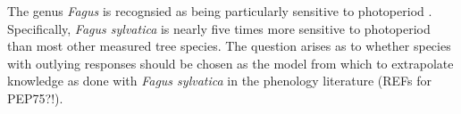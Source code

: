 \documentclass{article}\usepackage[]{graphicx}\usepackage[]{color}
\begin{document}
The genus \emph{Fagus} is recognsied as being particularly sensitive to photoperiod \citep{fu2019}. Specifically, \emph{Fagus sylvatica} is nearly five times more sensitive to photoperiod than most other measured tree species. The question arises as to whether species with outlying responses should be chosen as the model from which to extrapolate knowledge as done with \emph{Fagus sylvatica} in the phenology literature (REFs for PEP75?!). \\%









\end{document}
